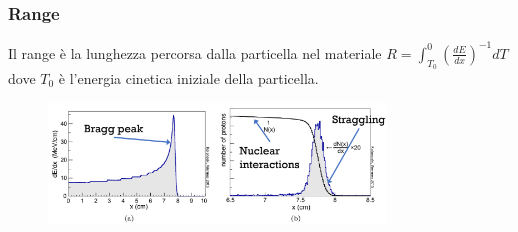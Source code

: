 \subsubsection*{Range}
Il range è la lunghezza percorsa dalla particella nel materiale $R=\int_{T_0}^0 (\frac{dE}{dx})^{-1} dT$ dove $T_0$ è l'energia cinetica iniziale della particella.

\begin{figure}[H]
    \centering
    \includegraphics[width=0.8\textwidth,frame]{Chapters/images/Interazione_radiazione_materia/image-20220214185815482.png}
    \captionsetup{width=0.8\linewidth}
    \label{fig:straggling}
\end{figure}


